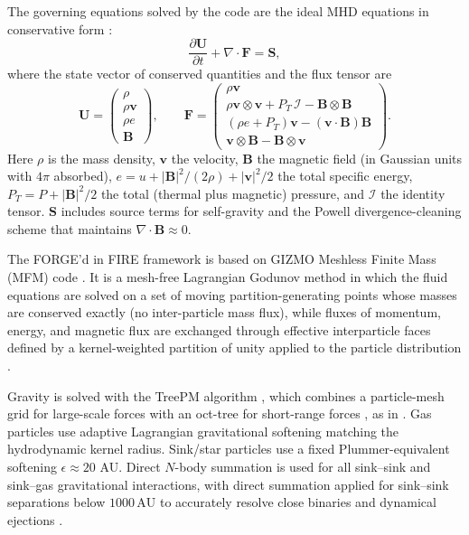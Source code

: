 \documentclass[twocolumn]{openjournal}
\begin{document}
The governing equations solved by the code are the ideal MHD equations
in conservative form \citep{A_new_class_of_Hopkin_2015, Hopkins_Raives_2015}:
\begin{equation}
	\frac{\partial \mathbf{U}}{\partial t} + \nabla \cdot \mathbf{F} = \mathbf{S},
	\label{eq:mhd_conservation}
\end{equation}
where the state vector of conserved quantities and the flux tensor are
\begin{equation}
	\mathbf{U} =
	\begin{pmatrix} \rho \\ \rho\mathbf{v} \\ \rho e \\ \mathbf{B} \end{pmatrix},
	\qquad
	\mathbf{F} =
	\begin{pmatrix}
		\rho\mathbf{v}                                                                     \\
		\rho\mathbf{v}\otimes\mathbf{v} + P_{T}\,\mathcal{I} - \mathbf{B}\otimes\mathbf{B} \\
		(\rho e + P_{T})\mathbf{v} - (\mathbf{v}\cdot\mathbf{B})\mathbf{B}                 \\
		\mathbf{v}\otimes\mathbf{B} - \mathbf{B}\otimes\mathbf{v}
	\end{pmatrix}.
	\label{eq:mhd_flux}
\end{equation}
Here $\rho$ is the mass density, $\mathbf{v}$ the velocity,
$\mathbf{B}$ the magnetic field (in Gaussian units with $4\pi$ absorbed),
$e = u + |\mathbf{B}|^{2}/(2\rho) + |\mathbf{v}|^{2}/2$ the total specific energy,
$P_{T} = P + |\mathbf{B}|^{2}/2$ the total (thermal plus magnetic) pressure,
and $\mathcal{I}$ the identity tensor.
$\mathbf{S}$ includes source terms for self-gravity and the Powell divergence-cleaning
scheme \citep{Hopkins_Raives_2015} that maintains $\nabla\cdot\mathbf{B}\approx 0$.

The FORGE'd in FIRE framework is based on GIZMO Meshless Finite Mass (MFM) code
\citep{A_new_class_of_Hopkin_2015}.
It is a mesh-free Lagrangian Godunov method in which
the fluid equations are solved on a set of moving partition-generating points
whose masses are conserved exactly (no inter-particle mass flux), while
fluxes of momentum, energy, and magnetic flux are exchanged through
effective interparticle faces defined by a kernel-weighted partition of unity
applied to the particle distribution \citep{A_new_class_of_Hopkin_2015}.

Gravity is solved with the TreePM algorithm \citep{A_new_class_of_Hopkin_2015},
which combines a particle-mesh grid for large-scale forces with an oct-tree
for short-range forces \citep{Barnes_Hut_1986}, as in \citet{Springel_2010b}.
Gas particles use adaptive Lagrangian gravitational softening matching the
hydrodynamic kernel radius.
Sink/star particles use a fixed Plummer-equivalent softening
$\epsilon \approx 20$ AU.
Direct $N$-body summation is used for all sink--sink and sink--gas
gravitational interactions, with direct summation applied for
sink--sink separations below $1000\,\mathrm{AU}$ to accurately
resolve close binaries and dynamical ejections
\citep{STARFORGE_Towa_Grudic_2021}.
\end{document}
